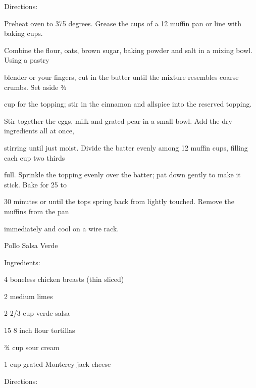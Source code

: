\documentclass[a4paper,portrait,12pt]{book}
\begin{document}
Directions:




Preheat oven to 375 degrees. Grease the cups of a 12 muffin pan or line with baking cups.




Combine the flour, oats, brown sugar, baking powder and salt in a mixing bowl. Using a pastry




blender or your fingers, cut in the butter until the mixture resembles coarse crumbs. Set aside ¾




cup for the topping; stir in the cinnamon and allspice into the reserved topping.




Stir together the eggs, milk and grated pear in a small bowl. Add the dry ingredients all at once,




stirring until just moist. Divide the batter evenly among 12 muffin cups, filling each cup two thirds




full. Sprinkle the topping evenly over the batter; pat down gently to make it stick. Bake for 25 to




30 minutes or until the tops spring back from lightly touched. Remove the muffins from the pan




immediately and cool on a wire rack.







\newpage
Pollo Salsa Verde




Ingredients:




4 boneless chicken breasts (thin sliced)




2 medium limes




2-2/3 cup verde salsa




15 8 inch flour tortillas




¾ cup sour cream




1 cup grated Monterey jack cheese




Directions:
\end{document}
